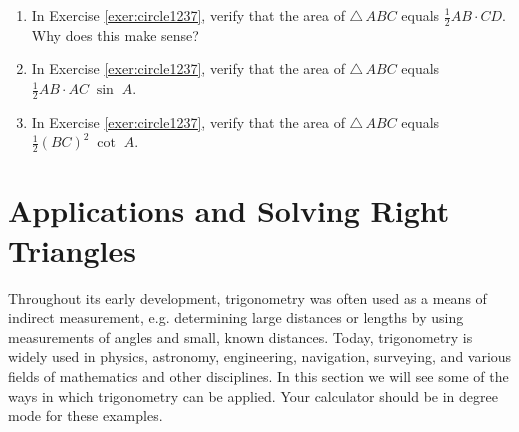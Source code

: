 {\begin{enumerate}[\bfseries 1.]
  $\sqrt{3}$ cm.
  \begin{enumerate}[\bfseries (a)]
   \item Find $\;\sin\;A$. (\emph{Hint: Use Thales' Theorem.})
   \item Find the length of $\;\overline{AC}$.
   \item Find the length of $\;\overline{AD}$.
   \item Figure \ref{fig:exer1.2.35} is drawn to scale. Use a protractor to\\ measure
   the angle $A$, then use your calculator to find\\the sine of that angle. Is the
   calculator result close to\\your answer from part(a)?\\Note: Make sure that your
   calculator is in degree mode.
  \end{enumerate}
[{[\bfseries 1.]}]
 \item In Exercise \ref{exer:circle1237}, verify that the area of $\triangle\,ABC$ equals
  $\frac{1}{2} AB \cdot CD$. Why does this make sense?
 \item In Exercise \ref{exer:circle1237}, verify that the area of $\triangle\,ABC$ equals
  $\frac{1}{2} AB \cdot AC \; \sin\;A$.
 \item In Exercise \ref{exer:circle1237}, verify that the area of $\triangle\,ABC$ equals
  $\frac{1}{2} (BC)^2 \;\cot\;A$.
\end{enumerate}}


\newpage
\section{Applications and Solving Right Triangles}
Throughout its early development, trigonometry was often used as a means of indirect
measurement, e.g. determining large distances or lengths by using
measurements of angles and small, known distances. Today, trigonometry is widely used in physics,
astronomy, engineering, navigation, surveying, and various
fields of mathematics and other disciplines. In this section we will see some of the ways in which
trigonometry can be applied. Your calculator should be in degree mode for these examples.

